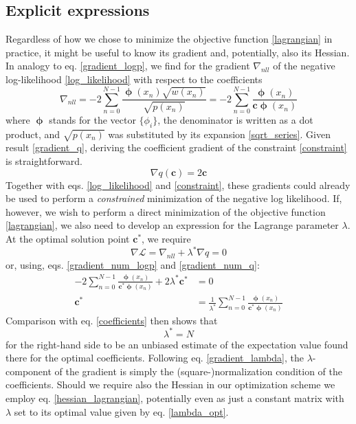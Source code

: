 \documentclass[]{report}
\begin{document}
		\subsection{Explicit expressions}
		Regardless of how we chose to minimize the objective function \ref{lagrangian} in practice, it might be useful to know its gradient and, potentially, also its Hessian. In analogy to eq. \ref{gradient_logp}, we find for the gradient $\nabla_{nll}$ of the negative log-likelihood \ref{log_likelihood} with respect to the coefficients
		\begin{equation}\label{gradient_num_logp}
			\nabla_{nll} = -2\sum_{n=0}^{N-1}\frac{\bm{\upphi}(x_n)\sqrt{w(x_n)}}{\sqrt{p(x_n)}} = -2\sum_{n=0}^{N-1}\frac{\bm{\upphi}(x_n)}{\mathbf{c}\bm{\upphi}(x_n)}
		\end{equation}
		where $\bm{\upphi}$ stands for the vector $\{\phi_i\}$, the denominator is written as a dot product, and $\sqrt{p(x_n)}$ was substituted by its expansion \ref{sqrt_series}. Given result \ref{gradient_q}, deriving the coefficient gradient of the constraint \ref{constraint} is straightforward.
		\begin{equation}\label{gradient_num_q}
			\nabla q(\mathbf{c}) = 2\mathbf{c}
		\end{equation}
		Together with eqs. \ref{log_likelihood} and \ref{constraint}, these gradients could already be used to perform a \emph{constrained} minimization of the negative log likelihood. If, however, we wish to perform a direct minimization of the objective function \ref{lagrangian}, we also need to develop an expression for the Lagrange parameter $\lambda$. At the optimal solution point $\mathbf{c}^*$, we require
		\begin{equation*}
			\nabla\mathcal{L} = \nabla_{nll} + \lambda^*\nabla q = 0
		\end{equation*}
		or, using, eqs. \ref{gradient_num_logp} and \ref{gradient_num_q}:
		\begin{align}
			-2\sum_{n=0}^{N-1}\frac{\bm{\upphi}(x_n)}{\mathbf{c}^*\bm{\upphi}(x_n)} + 2\lambda^*\mathbf{c}^* & = 0 \nonumber \\
			\mathbf{c}^* & = \frac{1}{\lambda^*}\sum_{n=0}^{N-1}\frac{\bm{\upphi}(x_n)}{\mathbf{c}^*\bm{\upphi}(x_n)}
		\end{align}
		Comparison with eq. \ref{coefficients} then shows that
		\begin{equation}\label{lambda_opt}
			\lambda^*=N
		\end{equation}
	    for the right-hand side to be an unbiased estimate of the expectation value found there for the optimal coefficients. Following eq. \ref{gradient_lambda}, the $\lambda$-component of the gradient is simply the (square-)normalization condition of the coefficients. Should we require also the Hessian in our optimization scheme we employ eq. \ref{hessian_lagrangian}, potentially even as just a constant matrix with $\lambda$ set to its optimal value given by eq. \ref{lambda_opt}.
				
\end{document}
